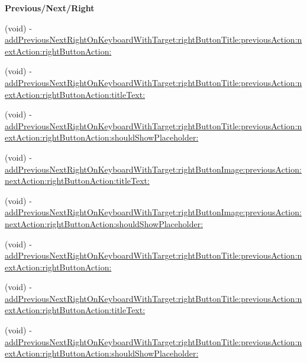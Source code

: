 \begin{Indent}\textbf{ Previous/\+Next/\+Right}\par
{\em 

 

 }\begin{DoxyCompactItemize}
\item 
(void) -\/ \mbox{\hyperlink{category_u_i_view_07_i_q_toolbar_addition_08_a4d1d6706d9364e84989f7353f606d2f9}{add\+Previous\+Next\+Right\+On\+Keyboard\+With\+Target\+:right\+Button\+Title\+:previous\+Action\+:next\+Action\+:right\+Button\+Action\+:}}
\item 
(void) -\/ \mbox{\hyperlink{category_u_i_view_07_i_q_toolbar_addition_08_a3541643bf32fe3b256737bc4357c07ab}{add\+Previous\+Next\+Right\+On\+Keyboard\+With\+Target\+:right\+Button\+Title\+:previous\+Action\+:next\+Action\+:right\+Button\+Action\+:title\+Text\+:}}
\item 
(void) -\/ \mbox{\hyperlink{category_u_i_view_07_i_q_toolbar_addition_08_aeda24f2aeec3c3f38bd8d02494677b70}{add\+Previous\+Next\+Right\+On\+Keyboard\+With\+Target\+:right\+Button\+Title\+:previous\+Action\+:next\+Action\+:right\+Button\+Action\+:should\+Show\+Placeholder\+:}}
\item 
(void) -\/ \mbox{\hyperlink{category_u_i_view_07_i_q_toolbar_addition_08_a26f6b992bacc26df65c0db912256351f}{add\+Previous\+Next\+Right\+On\+Keyboard\+With\+Target\+:right\+Button\+Image\+:previous\+Action\+:next\+Action\+:right\+Button\+Action\+:title\+Text\+:}}
\item 
(void) -\/ \mbox{\hyperlink{category_u_i_view_07_i_q_toolbar_addition_08_a204ed32ccf6ac66e9db3fa2e4bb2c76c}{add\+Previous\+Next\+Right\+On\+Keyboard\+With\+Target\+:right\+Button\+Image\+:previous\+Action\+:next\+Action\+:right\+Button\+Action\+:should\+Show\+Placeholder\+:}}
\item 
(void) -\/ \mbox{\hyperlink{category_u_i_view_07_i_q_toolbar_addition_08_a4d1d6706d9364e84989f7353f606d2f9}{add\+Previous\+Next\+Right\+On\+Keyboard\+With\+Target\+:right\+Button\+Title\+:previous\+Action\+:next\+Action\+:right\+Button\+Action\+:}}
\item 
(void) -\/ \mbox{\hyperlink{category_u_i_view_07_i_q_toolbar_addition_08_a3541643bf32fe3b256737bc4357c07ab}{add\+Previous\+Next\+Right\+On\+Keyboard\+With\+Target\+:right\+Button\+Title\+:previous\+Action\+:next\+Action\+:right\+Button\+Action\+:title\+Text\+:}}
\item 
(void) -\/ \mbox{\hyperlink{category_u_i_view_07_i_q_toolbar_addition_08_aeda24f2aeec3c3f38bd8d02494677b70}{add\+Previous\+Next\+Right\+On\+Keyboard\+With\+Target\+:right\+Button\+Title\+:previous\+Action\+:next\+Action\+:right\+Button\+Action\+:should\+Show\+Placeholder\+:}}

\end{DoxyCompactItemize}
\end{Indent}
